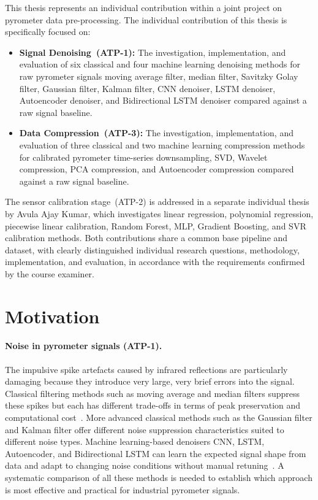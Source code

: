 This thesis represents an individual contribution within a joint project on pyrometer data pre-processing. The individual contribution of this thesis is specifically focused on:

\begin{itemize}[leftmargin=2em]
\item \textbf{Signal Denoising~(ATP-1):} The investigation, implementation, and evaluation of six classical and four machine learning denoising methods for raw pyrometer signals moving average filter, median filter, Savitzky Golay filter, Gaussian filter, Kalman filter, CNN denoiser, LSTM denoiser, Autoencoder denoiser, and Bidirectional LSTM denoiser compared against a raw signal baseline.

\item \textbf{Data Compression~(ATP-3):} The investigation, implementation, and evaluation of three classical and two machine learning compression methods for calibrated pyrometer time-series  downsampling, SVD, Wavelet compression, PCA compression, and Autoencoder compression  compared against a raw signal baseline.
\end{itemize}

The sensor calibration stage~(ATP-2) is addressed in a separate individual thesis by Avula Ajay Kumar, which investigates linear regression, polynomial regression, piecewise linear calibration, Random Forest, MLP, Gradient Boosting, and SVR calibration methods. Both contributions share a common base pipeline and dataset, with clearly distinguished individual research questions, methodology, implementation, and evaluation, in accordance with the requirements confirmed by the course examiner.

\section{Motivation}
\label{sec:motivation}

\paragraph{Noise in pyrometer signals (ATP-1).}
The impulsive spike artefacts caused by infrared reflections are particularly damaging because they introduce very large, very brief errors into the signal. Classical filtering methods such as moving average and median filters suppress these spikes but each has different trade-offs in terms of peak preservation and computational cost~\cite{kalman_wavelet_denoising}. More advanced classical methods such as the Gaussian filter and Kalman filter offer different noise suppression characteristics suited to different noise types. Machine learning-based denoisers CNN, LSTM, Autoencoder, and Bidirectional LSTM can learn the expected signal shape from data and adapt to changing noise conditions without manual retuning~\cite{zhang2023physics}. A systematic comparison of all these methods is needed to establish which approach is most effective and practical for industrial pyrometer signals.

